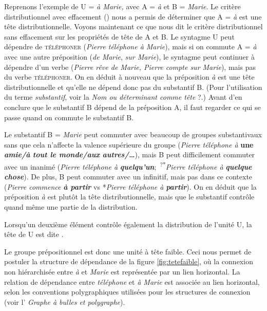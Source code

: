 Reprenons l’exemple de U = \textit{à Marie,} avec A = \textit{à} et B = \textit{Marie}. Le critère distributionnel avec effacement () nous a permis de déterminer que A = \textit{à} est une tête distributionnelle. Voyons maintenant ce que nous dit le critère distributionnel sans effacement sur les propriétés de tête de A et B. Le syntagme U peut dépendre de \textsc{téléphoner} (\textit{Pierre téléphone à Marie}), mais si on commute A = \textit{à} avec une autre préposition (\textit{de Marie}, \textit{sur Marie}), le syntagme peut continuer à dépendre d’un verbe (\textit{Pierre rêve de Marie, Pierre compte sur Marie}), mais pas du verbe \textsc{téléphoner}. On en déduit à nouveau que la préposition \textit{à} est une tête distributionnelle et qu’elle ne dépend donc pas du substantif B. (Pour l’utilisation du terme \textit{substantif}, voir la  \textit{Nom ou déterminant comme tête} ?.) Avant d’en conclure que le substantif B dépend de la préposition A, il faut regarder ce qui se passe quand on commute le substantif B.

Le substantif B = \textit{Marie} peut commuter avec beaucoup de groupes substantivaux sans que cela n’affecte la valence supérieure du groupe (\textit{Pierre téléphone à} \textbf{\textbf{une} \textit{amie/à} \textit{tout le monde/aux} \textit{autres/…}}), mais B peut difficilement commuter avec un inanimé (\textit{Pierre téléphone à} \textbf{\textit{quelqu’un}};~\textsuperscript{?*}\textit{Pierre téléphone à} \textbf{\textit{quelque chose}}). De plus, B peut commuter avec un infinitif, mais pas dans ce contexte (\textit{Pierre commence} \textbf{\textit{à partir}} vs *\textit{Pierre téléphone à} \textbf{\textit{partir}}). On en déduit que la préposition \textit{à} est plutôt la tête distributionnelle, mais que le substantif contrôle quand même une partie de la distribution.

{Lorsqu’un deuxième élément contrôle également la distribution de l’unité U, la tête de U est dite .}

Le groupe prépositionnel est donc une unité à tête faible. 
Ceci nous permet de postuler la structure de dépendance de la figure \ref{fig:tetefaible}, où la connexion non hiérarchisée entre \textit{à} et \textit{Marie} est représentée par un lien horizontal. La relation de dépendance entre \textit{téléphone} et \textit{à Marie} est associée au lien horizontal, selon les conventions polygraphiques utilisées pour les structures de connexion (voir l’ \textit{Graphe à bulles et polygraphe}). 

